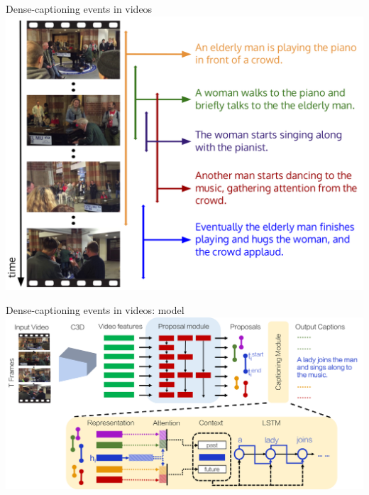 \documentclass{beamer}
\begin{document}
{%
\begin{frame}[fragile]{Dense-captioning events in videos}
        \center
        \hspace*{1cm}\includegraphics[scale=0.22]{data/dense-captioning-video.png}
\end{frame}
}

{%
\begin{frame}[fragile]{Dense-captioning events in videos: model}
        \center
        \hspace*{-0.25cm}\includegraphics[scale=0.2]{data/dense-captioning-video-architecture.png}
\end{frame}
}
\end{document}
